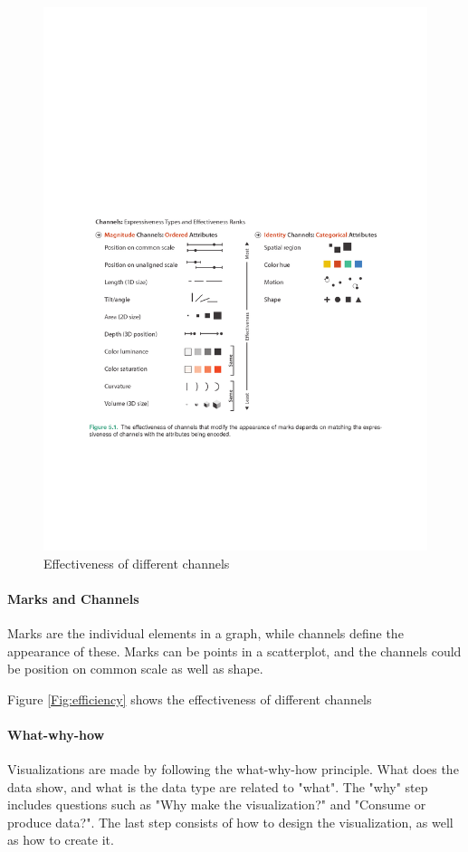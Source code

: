 \documentclass[11pt]{article}
\begin{document}
	
	\begin{figure}
		\center
		\includegraphics[scale=1,
		trim=80 215 75 330, clip]{channels_marks_effectiveness.pdf}
		\caption{Effectiveness of different channels}
		\label{Fig:efficiency
			}
	\end{figure}
	\paragraph{Marks and Channels\\}
	Marks are the individual elements in a graph, while channels define the appearance of these. Marks can be points in a scatterplot, and the channels could be position on common scale as well as shape. 
	
	Figure \ref{Fig:efficiency} shows the effectiveness of different channels
	
	\paragraph{What-why-how\\}
	Visualizations are made by following the what-why-how principle. What does the data show, and what is the data type are related to "what". The "why" step includes questions such as "Why make the visualization?" and "Consume or produce data?". The last step consists of how to design the visualization, as well as how to create it.
	
	
	
	
\end{document}
